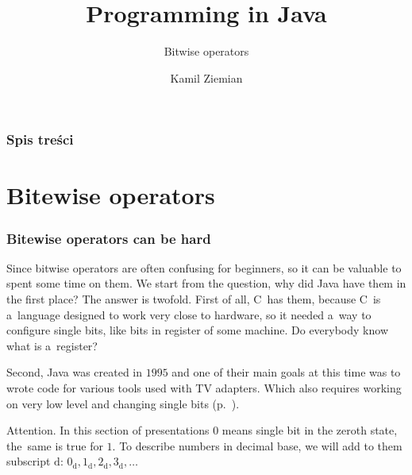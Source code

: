 \documentclass[10pt,t]{beamer}
\title{Programming in Java}
\subtitle{Bitwise operators}
\author{Kamil Ziemian \\
  \email}
\begin{document}





\RaggedRight





\maketitle





\begin{frame}
  \frametitle{Spis treści}


  \tableofcontents

\end{frame}










\section{Bitewise operators}


\begin{frame}
  \frametitle{Bitewise operators can be hard}


  Since bitwise operators are often confusing for beginners, so it can be
  valuable to spent some time on them. We start from the question, why did
  Java have them in the first place? The answer is twofold. First of all,
  C~has them, because C~is a~language designed to work very close to
  hardware, so it needed a~way to configure single bits, like bits in
  register of some machine. Do everybody know what is a~register?

  Second, Java was created in $1995$ and one of their main goals at this
  time was to wrote code for various tools used with TV adapters. Which also
  requires working on very low level and changing single bits
  (p.~\parencite{Eckel-Thinking-in-Java-Ed-polska-Wyd-III-Pub-2003}).

  \alert{Attention.} In this section of presentations $0$ means
  \alert{single} bit in the zeroth state, the~same is true for $1$.
  To describe numbers in decimal base, we will add to them subscript
  $\text{d}$: $0_{ \text{d} }, 1_{ \text{d} }, 2_{ \text{d} }, 3_{ \text{d} }, \ldots$

\end{frame}
\end{document}
